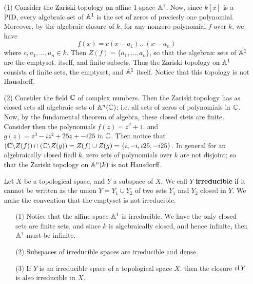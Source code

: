 \begin{example}\label{example_1.3}
    \item[(1)] Consider the Zariski topology on affine $1$-space  $\mathbb{A}^1$. Now, since
        $k[x]$ is a PID,  every algebraic set of $\mathbb{A}^1$ is the set of zeros of
        preciesly one polynomial. Moreover, by the algebraic closure of  $k$,
        for any nonzero polynomial  $f$ over  $k$, we have
        \begin{equation*}
            f(x)=c(x-a_1) \dots (x-a_n)
        \end{equation*}
        where $c,a_1, \dots, a_n \in k$. Then $Z(f)=\{a_1, \dots, a_n\}$, so
        that the algebraic sets of $\mathbb{A}^1$ are the emptyset, itself, and finite
        subsets. Thus the Zariski topology on  $\mathbb{A}^1$ consists of finite sets,
        the emptyset, and $\mathbb{A}^1$ itself. Notice that this topology is not Hausdorff.

    \item[(2)] Consider the field $\mathbb{C}$ of complex numbers. Then the Zariski
        topology has as closed sets all algebraic sets of  $\mathbb{A}^n(\mathbb{C})$; i.e. all
        sets of zeros of polynomials in $\mathbb{C}$. Now, by the fundamental theorem of
        algebra, these closed stets are finite. Consider then the polynomials
        $f(z)=z^2+1$, and $g(z)=z^3-iz^2+25z+-i25$ in $\mathbb{C}$. Then notice that
        $(\mathbb{C} \backslash Z(f)) \cap (\mathbb{C} \backslash Z(g))=Z(f) \cup Z(g)=\{i,-i,i25,
        -i25\}$. In general for an algebraically closed fiedl $k$, zero sets of
        polynomials over $k$ are not disjoint; so that the Zariski topology on
        $\mathbb{A}^n(k)$ is not Hausdorff.
\end{example}

\begin{definition}
    Let $X$ be a topological space, and  $Y$ a subspace of  $X$. We call  $Y$
     \textbf{irreducible} if it cannot be written as the union $Y=Y_1 \cup Y_2$
     of two sets $Y_1$ and $Y_2$ closed in $Y$. We make the convention that the
     emptyset is not irreducible.
\end{definition}

\begin{example}\label{example_1.4}
    \begin{enumerate}
        \item[(1)] Notice that the affine space $\mathbb{A}^1$ is irreducible. We have
            the only closed sets are finite sets, and since  $k$ is
            algebraically closed, and hence infinite, then  $\mathbb{A}^1$ must be
            infinite.

        \item[(2)] Subspaces of irreducible spaces are irreducible and dense.

        \item[(3)] If $Y$ is an irreducible space of a topological space  $X$,
            then the closure  $\operatorname{cl}{Y}$ is also irreducible in $X$.
    \end{enumerate}
\end{example}

